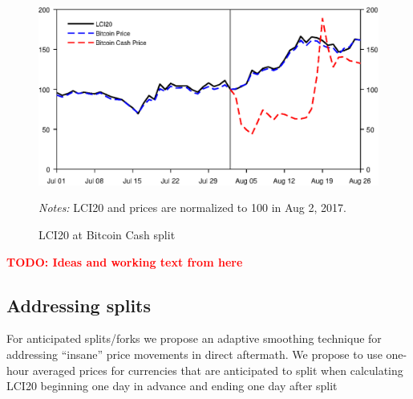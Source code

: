 \documentclass[11pt]{article}
\newcommand\fnotes[1]{\captionsetup{font=scriptsize}\caption*{\textsl{Notes:} #1}}
\newcommand{\todo}[1]{\textbf{\textcolor{red}{TODO: #1}}}
\begin{document}
\begin{figure}[p]%
    \centering%
    \caption{LCI20 at Bitcoin Cash split}\label{f:split}%
    \includegraphics[width=\textwidth]{figs/lci20_bch_split.eps}%
    \medskip\newline%
    \fnotes{LCI20 and prices are normalized to 100 in Aug 2, 2017.}
\end{figure}



\pagebreak

\todo{Ideas and working text from here}


\subsection{Addressing splits}\label{subseq:split_smoothing}
For anticipated splits/forks we propose an adaptive smoothing technique for addressing ``insane'' price movements in direct aftermath.
We propose to use one-hour averaged prices for currencies that are anticipated to split when calculating LCI20 beginning one day in advance and ending one day after split
\end{document}
